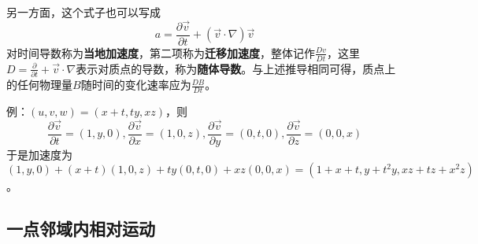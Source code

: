 \documentclass[a4paper,UTF8,fontset=windows]{ctexart}
\begin{document}
另一方面，这个式子也可以写成
$$a=\frac{\partial \vec{v}}{\partial t}+(\vec{v}\cdot\nabla)\vec{v}$$
对时间导数称为\textbf{当地加速度}，第二项称为\textbf{迁移加速度}，整体记作$\frac{Dv}{Dt}$，这里$D=\frac{\partial}{\partial t}+\vec{v}\cdot\nabla$表示对质点的导数，称为\textbf{随体导数}。与上述推导相同可得，质点上的任何物理量$B$随时间的变化速率应为$\frac{DB}{Dt}$。

例：$(u,v,w)=(x+t,ty,xz)$，则
$$\frac{\partial\vec{v}}{\partial t}=(1,y,0),\frac{\partial\vec{v}}{\partial x}=(1,0,z),\frac{\partial\vec{v}}{\partial y}=(0,t,0),\frac{\partial\vec{v}}{\partial z}=(0,0,x)$$
于是加速度为$(1,y,0)+(x+t)(1,0,z)+ty(0,t,0)+xz(0,0,x)=(1+x+t,y+t^2y,xz+tz+x^2z)$。

\subsection{一点邻域内相对运动}
\end{document}
